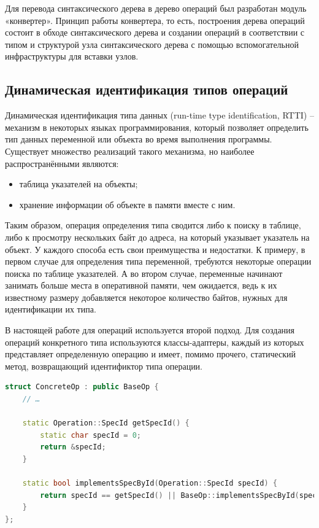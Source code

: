 Для перевода синтаксического дерева в дерево операций был разработан модуль «конвертер».
Принцип работы конвертера, то есть, построения дерева операций состоит в обходе синтаксического дерева и создании операций в соответствии с типом и структурой узла синтаксического дерева с помощью вспомогательной инфраструктуры для вставки узлов.

\subsection{Динамическая идентификация типов операций}
\label{sec:optree_rtti}

Динамическая идентификация типа данных (run-time type identification, RTTI) -- механизм в некоторых языках программирования, который позволяет определить тип данных переменной или объекта во время выполнения программы.
Существует множество реализаций такого механизма, но наиболее распространёнными являются:

\begin{itemize}
    \item таблица указателей на объекты;
    \item хранение информации об объекте в памяти вместе с ним.
\end{itemize}

Таким образом, операция определения типа сводится либо к поиску в таблице, либо к просмотру нескольких байт до адреса, на который указывает указатель на объект.
У каждого способа есть свои преимущества и недостатки.
К примеру, в первом случае для определения типа переменной, требуются некоторые операции поиска по таблице указателей.
А во втором случае, переменные начинают занимать больше места в оперативной памяти, чем ожидается, ведь к их известному размеру добавляется некоторое количество байтов, нужных для идентификации их типа.

В настоящей работе для операций используется второй подход.
Для создания операций конкретного типа используются классы-адаптеры, каждый из которых представляет определенную операцию и имеет, помимо прочего, статический метод, возвращающий идентификтор типа операции.

\begin{lstlisting}[language=C++, caption=Фрагмент реализации RTTI]
struct ConcreteOp : public BaseOp {
    // …

    static Operation::SpecId getSpecId() {
        static char specId = 0;
        return &specId;
    }

    static bool implementsSpecById(Operation::SpecId specId) {
        return specId == getSpecId() || BaseOp::implementsSpecById(specId);
    }
};
\end{lstlisting}

